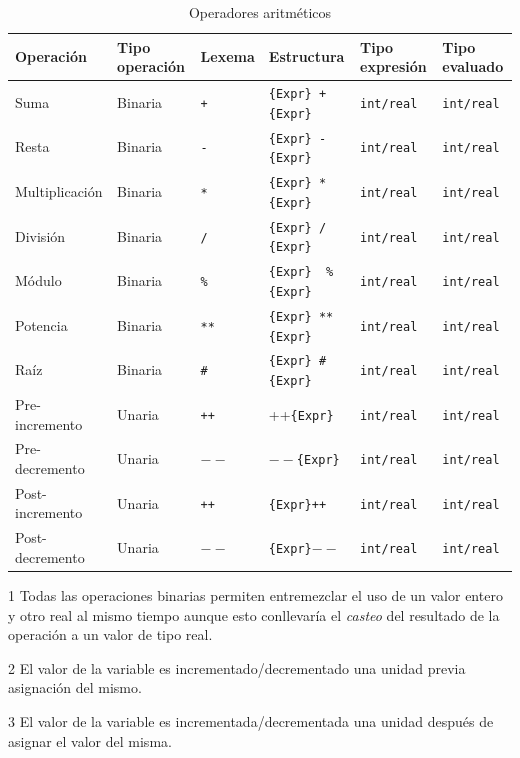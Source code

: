 \documentclass[11pt, english]{article}
\begin{document}
	\begin{table}[H]
		\begin{center}
			\caption{Operadores aritméticos}\label{tab:arithmetic}
			\begin{threeparttable}
				\begin{tabular}{l|l|l|l|l|l}
					\toprule
					\textbf{Operación} & \textbf{Tipo operación} & \textbf{Lexema} & \textbf{Estructura} & \textbf{Tipo expresión} & \textbf{Tipo evaluado} \tnote{1}\\
					\midrule
					Suma  & Binaria & \texttt{+} & \texttt{\{Expr\} + \{Expr\}} & \texttt{int/real} & \texttt{int/real}\\
					Resta & Binaria & \texttt{-} & \texttt{\{Expr\} - \{Expr\}} & \texttt{int/real} & \texttt{int/real}\\
					Multiplicación & Binaria & \texttt{*} & \texttt{\{Expr\} * \{Expr\}} & \texttt{int/real} & \texttt{int/real}\\
					División & Binaria & \texttt{/} & \texttt{\{Expr\} / \{Expr\}} & \texttt{int/real} & \texttt{int/real}\\
					Módulo & Binaria & \texttt{\%} & \texttt{\{Expr\}\, \% \{Expr\}} & \texttt{int/real} & \texttt{int/real}\\
					Potencia & Binaria & \texttt{**} & \texttt{\{Expr\} ** \{Expr\}} & \texttt{int/real} & \texttt{int/real}\\
					Raíz & Binaria & \texttt{\#} & \texttt{\{Expr\} \# \{Expr\}} & \texttt{int/real} & \texttt{int/real}\\
					Pre-incremento \tnote{2} & Unaria & \texttt{++} & ++\texttt{\{Expr\}} & \texttt{int/real} & \texttt{int/real}\\
					Pre-decremento \tnote{2} & Unaria & \texttt{$--$} & $--$\texttt{\{Expr\}} & \texttt{int/real} & \texttt{int/real}\\
					Post-incremento \tnote{3} & Unaria & \texttt{++} & \texttt{\{Expr\}++} & \texttt{int/real} & \texttt{int/real}\\
					Post-decremento \tnote{3} & Unaria & \texttt{$--$} & \texttt{\{Expr\}$--$} & \texttt{int/real} & \texttt{int/real}\\
					\bottomrule
				\end{tabular}
				\begin{tablenotes}
					\small
					\item[1] Todas las operaciones binarias permiten entremezclar el uso de un valor entero y otro real al mismo tiempo aunque esto conllevaría el \textit{casteo} del resultado de la operación a un valor de tipo real.
					\item [2] El valor de la variable es incrementado/decrementado una unidad previa asignación del mismo.
					\item[3] El valor de la variable es incrementada/decrementada una unidad después de asignar el valor del misma.
				\end{tablenotes}
			\end{threeparttable}
		\end{center}
	\end{table}
	
\end{document}
